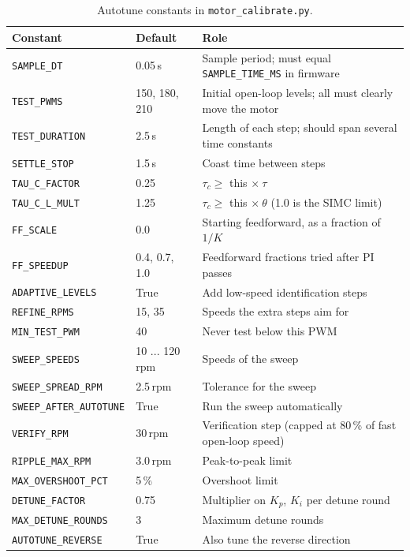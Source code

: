 \documentclass[11pt,a4paper]{report}
\newcommand{\code}[1]{\texttt{#1}}
\begin{document}
\begin{table}[H]
\centering
\caption{Autotune constants in \code{motor\_calibrate.py}.}\label{tab:const}
\small
\begin{tabular}{@{}llp{6.4cm}@{}}
\toprule
Constant & Default & Role\\
\midrule
\code{SAMPLE\_DT} & 0.05\,s & Sample period; must equal \code{SAMPLE\_TIME\_MS} in firmware\\
\code{TEST\_PWMS} & 150, 180, 210 & Initial open-loop levels; all must clearly move the motor\\
\code{TEST\_DURATION} & 2.5\,s & Length of each step; should span several time constants\\
\code{SETTLE\_STOP} & 1.5\,s & Coast time between steps\\
\code{TAU\_C\_FACTOR} & 0.25 & $\tau_c \ge$ this $\times\ \tau$\\
\code{TAU\_C\_L\_MULT} & 1.25 & $\tau_c \ge$ this $\times\ \theta$ (1.0 is the SIMC limit)\\
\code{FF\_SCALE} & 0.0 & Starting feedforward, as a fraction of $1/K$\\
\code{FF\_SPEEDUP} & 0.4, 0.7, 1.0 & Feedforward fractions tried after PI passes\\
\code{ADAPTIVE\_LEVELS} & True & Add low-speed identification steps\\
\code{REFINE\_RPMS} & 15, 35 & Speeds the extra steps aim for\\
\code{MIN\_TEST\_PWM} & 40 & Never test below this PWM\\
\code{SWEEP\_SPEEDS} & 10 ... 120\,rpm & Speeds of the sweep\\
\code{SWEEP\_SPREAD\_RPM} & 2.5\,rpm & Tolerance for the sweep\\
\code{SWEEP\_AFTER\_AUTOTUNE} & True & Run the sweep automatically\\
\code{VERIFY\_RPM} & 30\,rpm & Verification step (capped at 80\,\% of fast open-loop speed)\\
\code{RIPPLE\_MAX\_RPM} & 3.0\,rpm & Peak-to-peak limit\\
\code{MAX\_OVERSHOOT\_PCT} & 5\,\% & Overshoot limit\\
\code{DETUNE\_FACTOR} & 0.75 & Multiplier on $K_p$, $K_i$ per detune round\\
\code{MAX\_DETUNE\_ROUNDS} & 3 & Maximum detune rounds\\
\code{AUTOTUNE\_REVERSE} & True & Also tune the reverse direction\\
\bottomrule
\end{tabular}
\end{table}
\end{document}
